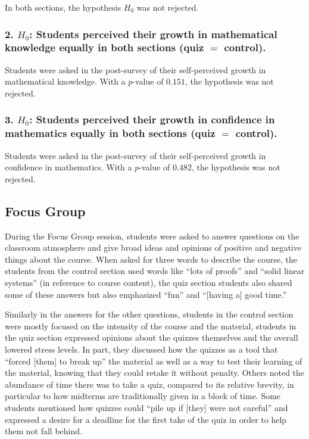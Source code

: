 In both sections, the hypothesis $H_0$ was not rejected.

\subsubsection{2. $H_0$: Students perceived their growth in mathematical knowledge equally in both sections (quiz $=$ control).}

Students were asked in the post-survey of their self-perceived growth in mathematical knowledge. With a $p$-value of $0.151$, the hypothesis was not rejected.

\subsubsection{3. $H_0$: Students perceived their growth in confidence in mathematics equally in both sections (quiz $=$ control).}

Students were asked in the post-survey of their self-perceived growth in confidence in mathematics. With a $p$-value of $0.482$, the hypothesis was not rejected.

\subsection{Focus Group}

During the Focus Group session, students were asked to answer questions on the classroom atmosphere and give broad ideas and opinions of positive and negative things about the course. When asked for three words to describe the course, the students from the control section used words like ``lots of proofs'' and ``solid linear systems'' (in reference to course content), the quiz section students also shared some of these answers but also emphasized ``fun'' and ``[having a] good time.''

Similarly in the answers for the other questions, students in the control section were mostly focused on the intensity of the course and the material, students in the quiz section expressed opinions about the quizzes themselves and the overall lowered stress levels. In part, they discussed how the quizzes as a tool that ``forced [them] to break up'' the material as well as a way to test their learning of the material, knowing that they could retake it without penalty. Others noted the abundance of time there was to take a quiz, compared to its relative brevity, in particular to how midterms are traditionally given in a block of time. Some students mentioned how quizzes could ``pile up if [they] were not careful'' and expressed a desire for a deadline for the first take of the quiz in order to help them not fall behind.

